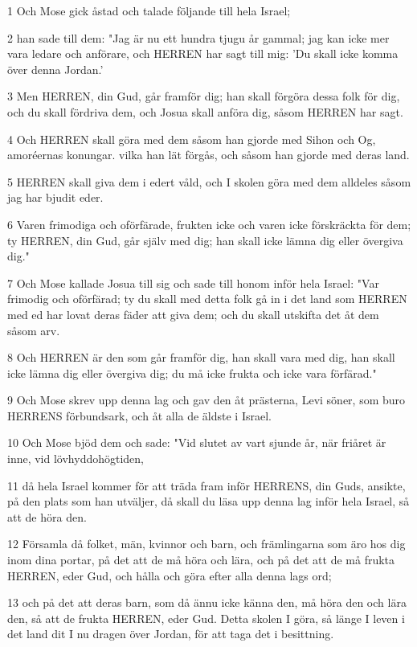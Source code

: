 \par 1 Och Mose gick åstad och talade följande till hela Israel;
\par 2 han sade till dem: "Jag är nu ett hundra tjugu år gammal; jag kan icke mer vara ledare och anförare, och HERREN har sagt till mig: 'Du skall icke komma över denna Jordan.'
\par 3 Men HERREN, din Gud, går framför dig; han skall förgöra dessa folk för dig, och du skall fördriva dem, och Josua skall anföra dig, såsom HERREN har sagt.
\par 4 Och HERREN skall göra med dem såsom han gjorde med Sihon och Og, amoréernas konungar. vilka han lät förgås, och såsom han gjorde med deras land.
\par 5 HERREN skall giva dem i edert våld, och I skolen göra med dem alldeles såsom jag har bjudit eder.
\par 6 Varen frimodiga och oförfärade, frukten icke och varen icke förskräckta för dem; ty HERREN, din Gud, går själv med dig; han skall icke lämna dig eller övergiva dig."
\par 7 Och Mose kallade Josua till sig och sade till honom inför hela Israel: "Var frimodig och oförfärad; ty du skall med detta folk gå in i det land som HERREN med ed har lovat deras fäder att giva dem; och du skall utskifta det åt dem såsom arv.
\par 8 Och HERREN är den som går framför dig, han skall vara med dig, han skall icke lämna dig eller övergiva dig; du må icke frukta och icke vara förfärad."
\par 9 Och Mose skrev upp denna lag och gav den åt prästerna, Levi söner, som buro HERRENS förbundsark, och åt alla de äldste i Israel.
\par 10 Och Mose bjöd dem och sade: "Vid slutet av vart sjunde år, när friåret är inne, vid lövhyddohögtiden,
\par 11 då hela Israel kommer för att träda fram inför HERRENS, din Guds, ansikte, på den plats som han utväljer, då skall du läsa upp denna lag inför hela Israel, så att de höra den.
\par 12 Församla då folket, män, kvinnor och barn, och främlingarna som äro hos dig inom dina portar, på det att de må höra och lära, och på det att de må frukta HERREN, eder Gud, och hålla och göra efter alla denna lags ord;
\par 13 och på det att deras barn, som då ännu icke känna den, må höra den och lära den, så att de frukta HERREN, eder Gud. Detta skolen I göra, så länge I leven i det land dit I nu dragen över Jordan, för att taga det i besittning.
